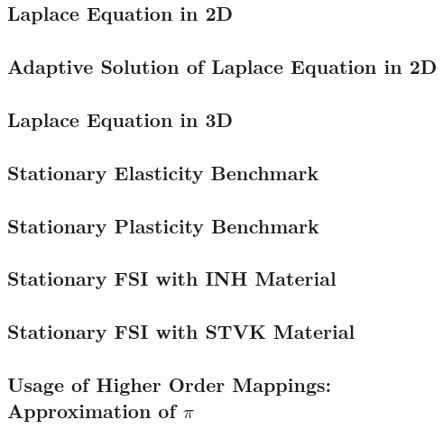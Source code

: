 \documentclass[a4paper,cleardoubleempty]{scrreprt}
\theoremstyle{plain}
\theoremstyle{remark}
\begin{document}
\subsection{Laplace Equation in 2D} 
\label{PDE_Stat_Laplace_2D}

\clearpage
\subsection{Adaptive Solution of Laplace Equation in 2D}
\label{PDE_adap_Stat_Laplace}

\clearpage
\subsection{Laplace Equation in 3D}
\label{PDE_Stat_Laplace_3D}

\clearpage
\subsection{Stationary Elasticity Benchmark} 
\label{PDE_Stat_Elasticity}

\clearpage
\subsection{Stationary Plasticity Benchmark} 
\label{PDE_Stat_Plasticity}

\clearpage
\subsection{Stationary FSI with INH Material} 
\label{PDE_Stat_FSI_INH}

\clearpage
\subsection{Stationary FSI with STVK Material} 
\label{PDE_Stat_FSI_STVK}

\clearpage
\subsection{Usage of Higher Order Mappings: Approximation of $\pi$}
\label{PDE_higher_order_mapping}

\clearpage
\end{document}
